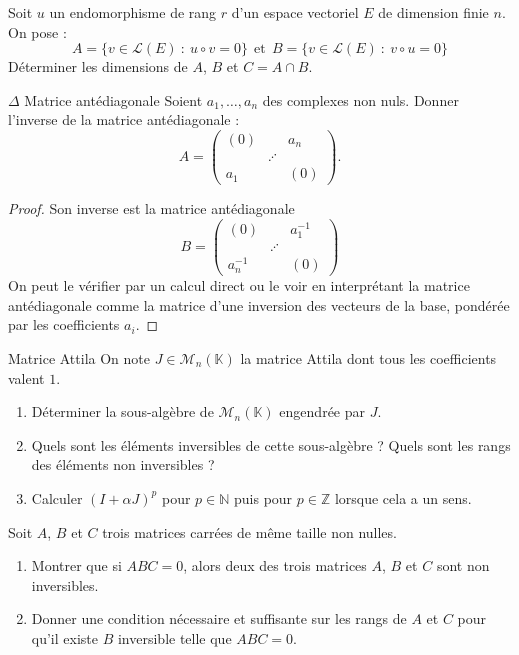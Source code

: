 \documentclass[french,a4paper]{article}
\newcommand{\N}{\mathbb{N}}
\newcommand{\Z}{\mathbb{Z}}
\newcommand{\K}{\mathbb{K}}
\newcommand{\inv}{^{-1}}
\theoremstyle{plain}
\theoremstyle{definition}
\theoremstyle{remark}
\begin{document}
\begin{ex}{}
	Soit $u$ un endomorphisme de rang $r$ d'un espace vectoriel $E$ de dimension finie $n$. On pose : $$A=\{v\in\mathcal{L}(E)\ : \ u\circ v=0\}\ \ \text{et}\ \ B=\{v\in\mathcal{L}(E)\ : \ v\circ u=0\}$$ Déterminer les dimensions de $A$, $B$ et $C=A\cap B$.
\end{ex}

\begin{ex}{$\Delta$ Matrice antédiagonale}
	Soient $a_1,\ldots,a_n$ des complexes non nuls. Donner l'inverse de la matrice antédiagonale : $$A=\begin{pmatrix}
		(0)&&a_n \\
		&\iddots&\\
		a_1&&(0)
	\end{pmatrix}.$$
\end{ex}
\begin{proof}
	Son inverse est la matrice antédiagonale $$B=\begin{pmatrix}
		(0)&&a_1\inv \\
		&\iddots&\\
		a_n\inv&&(0)
	\end{pmatrix}$$ On peut le vérifier par un calcul direct ou le voir en interprétant la matrice antédiagonale comme la matrice d'une inversion des vecteurs de la base, pondérée par les coefficients $a_i$.
\end{proof}

\begin{ex}{Matrice Attila}
	On note $J\in\mathcal{M}_n(\K)$ la matrice Attila dont tous les coefficients valent $1$.
	\begin{enumerate}
		\item Déterminer la sous-algèbre de $\mathcal{M}_n(\K)$ engendrée par $J$.
		\item Quels sont les éléments inversibles de cette sous-algèbre ? Quels sont les rangs des éléments non inversibles ?
		\item Calculer $(I+\alpha J)^p$ pour $p\in\N$ puis pour $p\in\Z$ lorsque cela a un sens.
	\end{enumerate}
\end{ex}

\begin{ex}{}
	Soit $A$, $B$ et $C$ trois matrices carrées de même taille non nulles.
	\begin{enumerate}
		\item Montrer que si $ABC=0$, alors deux des trois matrices $A$, $B$ et $C$ sont non inversibles.
		\item Donner une condition nécessaire et suffisante sur les rangs de $A$ et $C$ pour qu'il existe $B$ inversible telle que $ABC=0$.
	\end{enumerate}
\end{ex}
\end{document}
